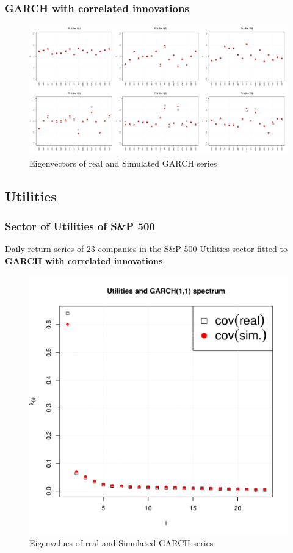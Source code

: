 \documentclass{beamer}
\begin{document}
\begin{frame}
  \frametitle{GARCH with correlated innovations}
  \begin{figure}[htb!]
    \centering
    \includegraphics[scale=0.2]{FX_eigenvectors.pdf}
    \caption{\scriptsize Eigenvectors of real and Simulated GARCH series}
  \end{figure}
\end{frame}

  
\subsection{Utilities}
\begin{frame}
  \frametitle{Sector of Utilities of S\&P 500}
  Daily return series of 23 companies in the S\&P 500 Utilities sector
  fitted to {\bf GARCH with correlated innovations}.
  \begin{figure}[htb!]
    \centering
    \includegraphics[scale=0.35]{Utilities_eigenvalues.pdf}
    \caption{\scriptsize Eigenvalues of real and Simulated GARCH series}
  \end{figure}
\end{frame}
\end{document}
